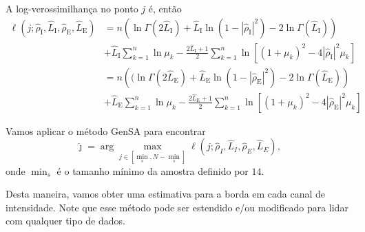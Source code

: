 \documentclass[12pt]{article}
\begin{document}
A log-verossimilhança no ponto $j$ é, então
\begin{equation}\label{eq:TotalLogLikelihood}
\begin{split}
\ell(j;\widehat{\rho}_\text{I}, \widehat{L}_\text{I}, \widehat{\rho}_\text{E}, \widehat{L}_\text{E})&=n\left(\ln\Gamma(2\widehat{L}_\text{I})+\widehat{L}_\text{I}\ln(1-|\widehat{\rho}_\text{I}|^2)-2\ln\Gamma(\widehat{L}_\text{I})\right)\\
                         &+\widehat{L}_\text{I}\sum_{k=1}^{n}\ln\mu_k-\frac{2\widehat{L}_\text{I}+1}{2}\sum_{k=1}^{n} \ln\left[(1+\mu_k)^2-4|\widehat{\rho}_\text{I}|^2\mu_k\right]\\
                         &=n\left((\ln\Gamma(2\widehat{L}_\text{E})+\widehat{L}_\text{E}\ln(1-|\widehat{\rho}_\text{E}|^2)-2\ln\Gamma(\widehat{L}_\text{E})\right)\\
                         &+\widehat{L}_\text{E}\sum_{k=1}^{n}\ln\mu_k-\frac{2\widehat{L}_\text{E}+1}{2}\sum_{k=1}^{n} \ln\left[(1+\mu_k)^2-4|\widehat{\rho}_\text{E}|^2\mu_k\right]
\end{split}
\end{equation}

Vamos aplicar o método GenSA para encontrar
$$
\widehat{\jmath}= \arg\max\limits_{j\in [\min_s,N-\min_s]}\ell(j;\widehat{\rho}_I, \widehat{L}_I,\widehat{\rho}_E, \widehat{L}_E),
$$ 
onde $\min_s$ é o tamanho mínimo da amostra definido por $14$.

Desta maneira, vamos obter uma estimativa para a borda em cada canal de intensidade.
Note que esse método pode ser estendido e/ou modificado para lidar com qualquer tipo de dados.




\end{document}
